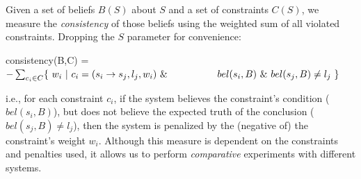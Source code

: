 \documentclass[11pt]{article}
\newenvironment{myquote}{                   %
  \parskip 0mm \begin{quoting}[vskip=0mm,leftmargin=2mm]}{
\end{quoting}}
\begin{document}
Given a set of beliefs $B(S)$ about $S$ and a set of constraints $C(S)$, we measure the {\it consistency}
of those beliefs using the weighted sum of all violated constraints. Dropping the $S$ parameter for convenience:
 \begin{myquote}
  consistency(B,C) = \\
\hspace*{2mm}  $- \sum_{c_i \in C} \{~ w_i ~ | ~ c_i = (s_i \rightarrow s_j, l_j, w_i )       ~\& \\
\hspace*{18mm}  bel(s_i,B) ~ \& ~ bel(s_j,B) \neq l_j ~ \}$
\end{myquote}
i.e., for each constraint $c_i$, if the system believes the constraint's condition ($bel(s_i,B)$), but does not
believe the expected truth of the conclusion ($bel(s_j,B) \neq l_j$), then the system is penalized by the (negative of)
the constraint's weight $w_i$. Although this measure is dependent on the constraints and penalties used,
it allows us to perform {\it comparative} experiments with different systems.
\end{document}
